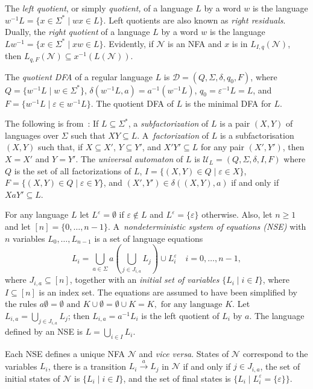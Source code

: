 \documentclass[preprint,12pt]{elsarticle}
\renewcommand{\ge}{\geqslant}
\newcommand{\eps}{\varepsilon}
\newcommand{\emp}{\emptyset}
\newcommand{\Sig}{\Sigma}
\newcommand{\cD}{{\mathcal D}}
\newcommand{\cN}{{\mathcal N}}
\newcommand{\cU}{{\mathcal U}}
\begin{document}
The \emph{left quotient}, or simply \emph{quotient,} of a language $L$ 
by a word $w$ is  the language $w^{-1}L=\{x\in \Sig^*\mid wx\in L \}$. 
Left quotients are also known as \emph{right residuals}.
Dually, the \emph{right quotient} of a language $L$ by a word $w$ is  
the language $Lw^{-1}=\{x\in \Sig^*\mid xw\in L \}$. 
Evidently, if $\cN$ is an NFA and $x$ is in $L_{I,q}(\cN)$,  
then $L_{q,F}(\cN)\subseteq x^{-1}(L(\cN))$.

The \emph{quotient DFA} of a regular language $L$ is 
$\cD=(Q, \Sig, \delta, q_0,F)$, where $Q=\{w^{-1}L\mid w\in\Sig^*\}$, 
$\delta(w^{-1}L,a)=a^{-1}(w^{-1}L)$, 
$q_0=\eps^{-1}L=L$,  and
$F=\{w^{-1}L \mid \eps\in w^{-1}L\}$.
The quotient DFA of $L$ is the minimal DFA for $L$.


The following is from~\cite{LoSa07}:
If $L\subseteq \Sig^*$, a \emph{subfactorization} 
of $L$ is  a pair $(X, Y)$ of languages 
over $\Sig$ such that $X Y \subseteq L $.
A~\emph{factorization} of $L$ is 
a subfactorisation $(X, Y)$ such that, if $X \subseteq X'$,  $Y \subseteq Y'$,
and $X'Y' \subseteq L$ for any pair $(X',Y')$, then $X = X'$ and $Y = Y'$.
The \emph{universal automaton} of $L$ is 
$\cU_L=(Q,\Sigma,\delta,I,F)$ where $Q$ is the set of all factorizations
of $L$, $I=\{(X,Y)\in Q \;|\; \eps\in X\}$,
$F=\{(X,Y)\in Q \;|\; \eps\in Y\}$, and
$(X',Y')\in\delta((X,Y),a)$ if and only if $XaY'\subseteq L$.


For any language $L$ let $L^\eps=\emp$ if $\eps\not\in L$ and $L^\eps=\{\eps\}$
otherwise.
Also, let $n\ge 1$ and let $[n]=\{0,\ldots,n-1\}$.
A~\emph{nondeterministic system of equations (NSE)} with $n$ variables 
$L_0,\ldots, L_{n-1}$ is a set of language equations \\
\begin{equation}
L_i = \bigcup_{a\in \Sig} a(\bigcup_{j\in J_{i,a}} L_j) \cup L_i^\eps \quad i=0,\ldots,n-1,
\end{equation}
where $J_{i,a}\subseteq [n]$,  together with an 
\emph{initial set of variables}  $\{L_i\mid i\in I\}$, where $I\subseteq [n]$ is an index set.
The equations are assumed to have been simplified by the rules
$a\emp=\emp \text{ and } K\cup \emp= \emp\cup K=K, \text{ for any language } K.$
Let $L_{i,a}=\bigcup_{j\in J_{i,a}} L_j$; then $L_{i,a}=a^{-1}L_i$ is the left quotient of $L_i$ by $a$.
The language defined by an NSE is $L=\bigcup_{i\in I} L_i$.

Each NSE defines a unique NFA $\cN$ and \emph{vice versa}. States of $\cN$ correspond 
to the variables $L_i$, there is a transition  $L_i \stackrel{a}{\rightarrow} L_j$ 
in $\cN$ if and only if $j\in J_{i,a}$, the set of initial states of $\cN$ is 
$\{L_i \mid i\in I\}$, and the set of final states is $\{L_i \mid L_i^\eps=\{\eps\}\}$.
\end{document}
